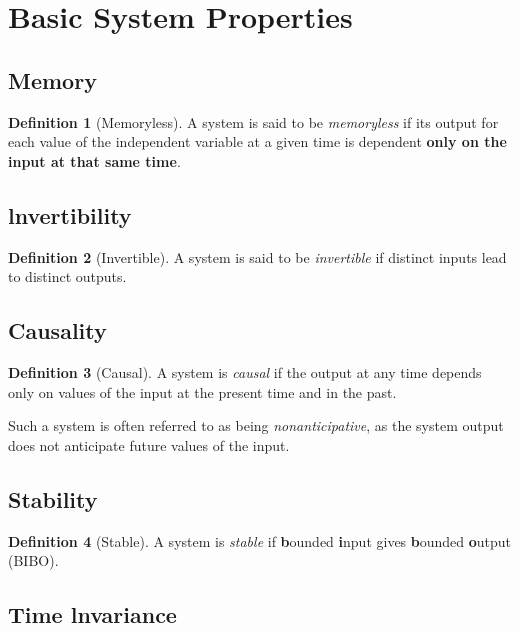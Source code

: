 \documentclass[10pt,UTF8]{article}
\newenvironment{definition box}
{\begin{tcolorbox}[colback=blue!5!white,colframe=blue!75!black,parbox=false,before upper=\par,before lower=\par]}
{\end{tcolorbox}}
\theoremstyle{definition}
\newtheorem*{definition inner}{Definition}
\newenvironment{definition}[1][]
{\begin{definition box}\begin{definition inner}[#1]\hfill\par}
{\end{definition inner}\end{definition box}}
\theoremstyle{remark}
\begin{document}
\section{Basic System Properties}

\subsection{Memory}

\begin{definition}[Memoryless]
    A system is said to be \emph{memoryless}
    if its output for each value of the independent variable
    at a given time is dependent \textbf{only on the input at that same time}. 
\end{definition}

\subsection{lnvertibility}

\begin{definition}[Invertible]
    A system is said to be \emph{invertible}
    if distinct inputs lead to distinct outputs.
\end{definition}

\subsection{Causality}

\begin{definition}[Causal]
    A system is \emph{causal}
    if the output at any time depends only on values of the input at the
    present time and in the past.
\end{definition}

Such a system is often referred to as being \emph{nonanticipative},
as the system output does not anticipate future values of the input.

\subsection{Stability}

\begin{definition}[Stable]
    A system is \emph{stable} if
    \textbf{b}ounded \textbf{i}nput gives \textbf{b}ounded \textbf{o}utput
    (BIBO).
\end{definition}

\subsection{Time lnvariance}
\end{document}
